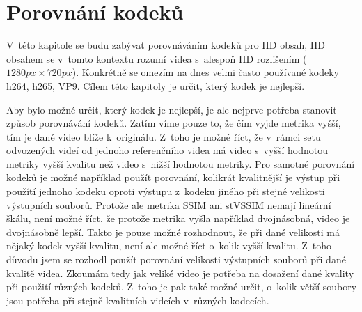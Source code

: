 \documentclass[thesis=M,czech]{FITthesis}[2016/06/26]
\begin{document}
\chapter{Porovnání kodeků}
V~této kapitole se budu zabývat porovnáváním kodeků pro HD obsah, HD obsahem se v~tomto kontextu rozumí videa s~alespoň HD rozlišením ($1280px \times 720px$). Konkrétně se omezím na dnes velmi často používané kodeky h264, h265, VP9. Cílem této kapitoly je určit, který kodek je nejlepší. 

Aby bylo možné určit, který kodek je nejlepší, je ale nejprve potřeba stanovit způsob porovnávání kodeků. Zatím víme pouze to, že čím vyjde metrika vyšší, tím je dané video blíže k~originálu. Z~toho je možné říct, že v~rámci setu odvozených videí od jednoho referenčního videa má video s~vyšší hodnotou metriky vyšší kvalitu než video s~nižší hodnotou metriky. Pro samotné porovnání kodeků je možné například použít porovnání, kolikrát kvalitnější je výstup při použítí jednoho kodeku oproti výstupu z~kodeku jiného při stejné velikosti výstupních souborů. Protože ale metrika SSIM ani stVSSIM nemají lineární škálu, není možné říct, že protože metrika vyšla například dvojnásobná, video je dvojnásobně lepší. Takto je pouze možné rozhodnout, že při dané velikosti má nějaký kodek vyšší kvalitu, není ale možné říct o~kolik vyšší kvalitu. Z~toho důvodu jsem se rozhodl použít porovnání velikosti výstupních souborů při dané kvalitě videa. Zkoumám tedy jak veliké video je potřeba na dosažení dané kvality při použití různých kodeků. Z~toho je pak také možné určit, o~kolik větší soubory jsou potřeba při stejně kvalitních videích v~různých kodecích.
\end{document}
